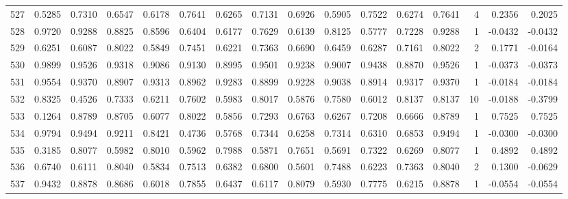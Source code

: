 \begin{tabular}{lrrrrrrrrrrrrrrr}
527 &      0.5285 &  0.7310 &  0.6547 &  0.6178 &  0.7641 &  0.6265 &  0.7131 &  0.6926 &  0.5905 &  0.7522 &   0.6274 &     0.7641 &      4 &                    0.2356 &                     0.2025 \\
528 &      0.9720 &  0.9288 &  0.8825 &  0.8596 &  0.6404 &  0.6177 &  0.7629 &  0.6139 &  0.8125 &  0.5777 &   0.7228 &     0.9288 &      1 &                   -0.0432 &                    -0.0432 \\
529 &      0.6251 &  0.6087 &  0.8022 &  0.5849 &  0.7451 &  0.6221 &  0.7363 &  0.6690 &  0.6459 &  0.6287 &   0.7161 &     0.8022 &      2 &                    0.1771 &                    -0.0164 \\
530 &      0.9899 &  0.9526 &  0.9318 &  0.9086 &  0.9130 &  0.8995 &  0.9501 &  0.9238 &  0.9007 &  0.9438 &   0.8870 &     0.9526 &      1 &                   -0.0373 &                    -0.0373 \\
531 &      0.9554 &  0.9370 &  0.8907 &  0.9313 &  0.8962 &  0.9283 &  0.8899 &  0.9228 &  0.9038 &  0.8914 &   0.9317 &     0.9370 &      1 &                   -0.0184 &                    -0.0184 \\
532 &      0.8325 &  0.4526 &  0.7333 &  0.6211 &  0.7602 &  0.5983 &  0.8017 &  0.5876 &  0.7580 &  0.6012 &   0.8137 &     0.8137 &     10 &                   -0.0188 &                    -0.3799 \\
533 &      0.1264 &  0.8789 &  0.8705 &  0.6077 &  0.8022 &  0.5856 &  0.7293 &  0.6763 &  0.6267 &  0.7208 &   0.6666 &     0.8789 &      1 &                    0.7525 &                     0.7525 \\
534 &      0.9794 &  0.9494 &  0.9211 &  0.8421 &  0.4736 &  0.5768 &  0.7344 &  0.6258 &  0.7314 &  0.6310 &   0.6853 &     0.9494 &      1 &                   -0.0300 &                    -0.0300 \\
535 &      0.3185 &  0.8077 &  0.5982 &  0.8010 &  0.5962 &  0.7988 &  0.5871 &  0.7651 &  0.5691 &  0.7322 &   0.6269 &     0.8077 &      1 &                    0.4892 &                     0.4892 \\
536 &      0.6740 &  0.6111 &  0.8040 &  0.5834 &  0.7513 &  0.6382 &  0.6800 &  0.5601 &  0.7488 &  0.6223 &   0.7363 &     0.8040 &      2 &                    0.1300 &                    -0.0629 \\
537 &      0.9432 &  0.8878 &  0.8686 &  0.6018 &  0.7855 &  0.6437 &  0.6117 &  0.8079 &  0.5930 &  0.7775 &   0.6215 &     0.8878 &      1 &                   -0.0554 &                    -0.0554 \\

\end{tabular}
